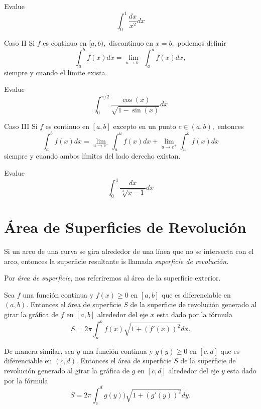 \begin{problema}
 Evalue
 $$\displaystyle \int_{0}^{1}\dfrac{dx}{x^{2}} dx$$
\end{problema}



{Caso II}
Si $f$ es continuo en $[a,b),$ discontinuo en $x=b,$ podemos definir
$$
\displaystyle \int_{a}^{b}f(x)dx=\lim_{u\to b^{-}} \int_{a}^{u}f(x)dx,
$$ siempre y cuando el l\'imite exista.


\begin{problema}
 Evalue
 $$\displaystyle \int_{0}^{\pi/2}\dfrac{\cos(x)}{\sqrt{1-\sin(x)}} dx$$
\end{problema}



{Caso III}
Si $f$ es continuo en $[a,b]$ excepto en un punto $c\in(a,b),$ entonces
$$
\int_{a}^{b}f(x)dx = 
\lim_{u \to c^{-}} \int_{a}^{u}f(x)dx+
\lim_{u \to c^{+}} \int_{u}^{b}f(x)dx
$$
siempre y cuando ambos l\'imites del lado derecho existan.


\begin{problema}
 Evalue 
$$\displaystyle \int_{0}^{4}\dfrac{dx}{\sqrt[3]{x-1}} dx$$
\end{problema}


\section{Área de Superficies de Revoluci\'on}


Si un arco de una curva se gira alrededor de una l\'inea que no se intersecta con el arco, entonces la superficie resultante is llamada \emph{superficie de revoluci\'on.} 

Por \emph{área de superficie,} nos referiremos al área de la superficie exterior.




Sea $f$ una funci\'on continua y $f(x)\geq 0$  en $[a,b]$ que es diferenciable en $(a,b).$  Entonces el área de superficie $S$ de la superficie de revoluci\'on  generado al girar la gráfica de $f$ en $[a,b]$ alrededor del eje $x$ esta dado por la f\'ormula
\begin{equation}
 \label{36.1}
 S=2\pi \int_{a}^{b}f(x)\sqrt{1+(f'(x))^{2}}dx.
\end{equation}





De manera similar, sea $g$ una funci\'on continua y $g(y) \geq 0$  en $[c,d]$ que es diferenciable en $(c,d).$  Entonces el área de superficie $S$ de la superficie de revoluci\'on  generado al girar la gráfica de $g$ en $[c,d]$ alrededor del eje $y$ esta dado por la f\'ormula
\begin{equation}
 \label{36.2}
 S=2\pi \int_{c}^{d}g(y))\sqrt{1+(g'(y))^{2}}dy.
\end{equation}




